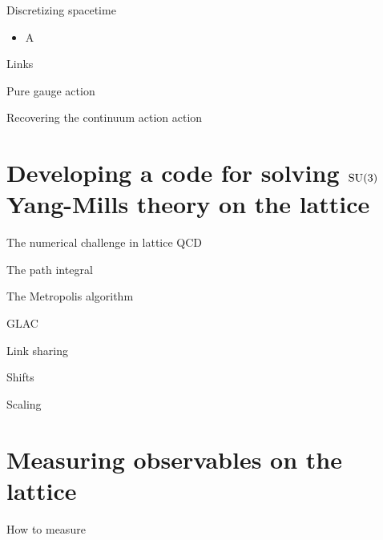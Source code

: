 \documentclass[10pt,show notes on second screen]{beamer}
\begin{document}
\begin{frame}{Discretizing spacetime}
    \begin{itemize}[<+->]
        \item A
    \end{itemize}
\end{frame}

\begin{frame}{Links}
\end{frame}

\begin{frame}{Pure gauge action}
\end{frame}

\begin{frame}{Recovering the continuum action action}
\end{frame}

\section{Developing a code for solving \texorpdfstring{$\mathrm{SU}(3)$}{SU3} Yang-Mills theory on the lattice}

\begin{frame}{The numerical challenge in lattice QCD}
\end{frame}

\begin{frame}{The path integral}
\end{frame}

\begin{frame}{The Metropolis algorithm}
\end{frame}

\begin{frame}{GLAC}
\end{frame}

\begin{frame}{Link sharing}
\end{frame}

\begin{frame}{Shifts}
\end{frame}

\begin{frame}{Scaling}
\end{frame}

\section{Measuring observables on the lattice}
\begin{frame}{How to measure}
\end{frame}
\end{document}
